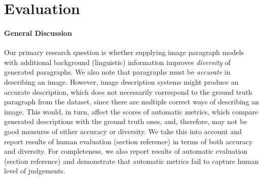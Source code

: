 \documentclass[11pt,a4paper]{article}
\begin{document}

\section{Evaluation}

\iffalse
\paragraph{General Discussion}
Our primary research question is whether supplying image paragraph models with additional background (linguistic) information improves \textit{diversity} of generated paragraphs.
We also note that paragraphs must be \textit{accurate} in describing an image.
However, image description systems might produce an accurate description, which does not necessarily correspond to the ground truth paragraph from the dataset, since there are multiple correct ways of describing an image.
This would, in turn, affect the scores of automatic metrics, which compare generated descriptions with the ground truth ones, and, therefore, may not be good measures of either accuracy or diversity.
We take this into account and report results of human evaluation (section reference) in terms of both accuracy and diversity.
For completeness, we also report results of automatic evaluation (section reference) and demonstrate that automatic metrics fail to capture human level of judgements.
\end{document}
